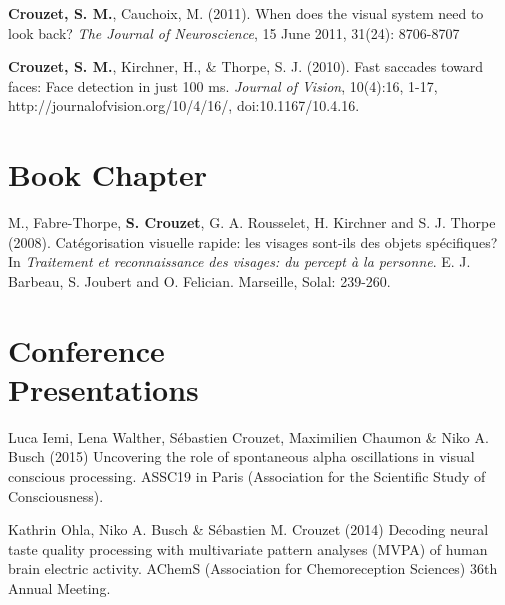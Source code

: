 \documentclass[margin,line]{resume}
\begin{document}
\begin{resume}
	\vspace{-2mm} \textbf{Crouzet, S. M.}, Cauchoix, M. (2011). When does the visual system need to look back?  \textit{The Journal of Neuroscience}, 15 June 2011, 31(24): 8706-8707

	\vspace{-2mm} \textbf{Crouzet, S. M.}, Kirchner, H., \& Thorpe, S. J.  (2010). Fast saccades toward faces: Face detection in just 100 ms. \textit{Journal of Vision}, 10(4):16, 1-17, http://journalofvision.org/10/4/16/, doi:10.1167/10.4.16.
	


	\vspace{3mm}	
    \section{\mysidestyle Book Chapter}

M., Fabre-Thorpe, \textbf{S. Crouzet}, G. A. Rousselet, H. Kirchner and S. J. Thorpe (2008). Catégorisation visuelle rapide: les visages sont-ils des objets spécifiques? In \textsl{Traitement et reconnaissance des visages: du percept à la personne}. E. J. Barbeau, S. Joubert and O. Felician. Marseille, Solal: 239-260.

	\vspace{3mm}	
    \section{\mysidestyle Conference\\Presentations}

\footnotesize %

Luca Iemi, Lena Walther, Sébastien Crouzet, Maximilien Chaumon \& Niko A. Busch (2015) Uncovering the role of spontaneous alpha oscillations in visual conscious processing. ASSC19 in Paris (Association for the Scientific Study of Consciousness).
	
\vspace{-2mm} Kathrin Ohla, Niko A. Busch \& Sébastien M. Crouzet (2014) Decoding neural taste quality processing with multivariate pattern analyses (MVPA) of human brain electric activity. AChemS (Association for Chemoreception Sciences) 36th Annual Meeting.


\end{resume}
\end{document}
